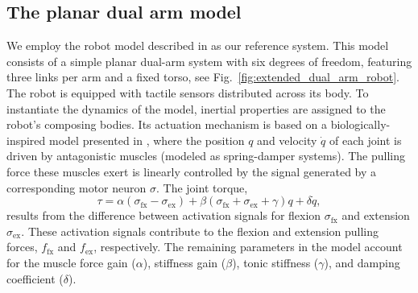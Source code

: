 \subsection{The planar dual arm model}
We employ the robot model described in \cite{Mannella2018Knowyourbody,Marcel2022Learningreachown} as our reference system. This model consists of a simple planar dual-arm system with six degrees of freedom, featuring three links per arm and a fixed torso, see Fig.~\ref{fig:extended_dual_arm_robot}. The robot is equipped with tactile sensors distributed across its body. To instantiate the dynamics of the model, inertial properties are assigned to the robot's composing bodies. Its actuation mechanism is based on a biologically-inspired model presented in \cite{Ekeberg1993combinedneuronalmechanical,Wadden1998neuromechanicalmodel, Shim2012Chaoticexplorationlearning}, where the position $q$ and velocity $\dot{q}$ of each joint is driven by antagonistic muscles (modeled as spring-damper systems). The pulling force these muscles exert is linearly controlled by the signal generated by a corresponding motor neuron $\sigma$. The joint torque,
\begin{equation}\label{eq:antagonistic_torque}
	\tau = \alpha \left(\sigma_\mathrm{fx} - \sigma_\mathrm{ex}\right)  + \beta \left(\sigma_\mathrm{fx} + \sigma_\mathrm{ex} + \gamma \right) q + \delta \dot{q},
\end{equation}
results from the difference between activation signals for flexion $ \sigma_\mathrm{fx} $ and extension $\sigma_\mathrm{ex}$. These activation signals contribute to the flexion and extension pulling forces, $ f_\mathrm{fx}$ and $f_\mathrm{ex} $, respectively. The remaining parameters in the model account for the muscle force gain ($\alpha$), stiffness gain ($\beta$), tonic stiffness ($\gamma$), and damping coefficient ($\delta$).


